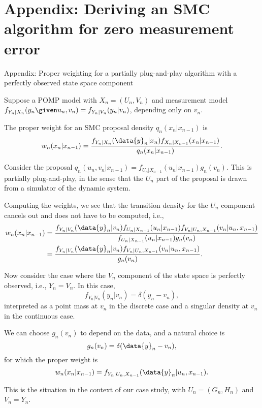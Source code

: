 \section{Appendix: Deriving an SMC algorithm for zero measurement error}

\begin{frame}[fragile]{Appendix: Proper weighting for a partially plug-and-play algorithm with a perfectly observed state space component}

\vspace{-2mm}

\bi

\item Suppose a POMP model with $X_n=(U_n,V_n)$ and measurement model $f_{Y_n|X_n}(y_n\given u_n,v_n) = f_{Y_n|V_n}(y_n|v_n)$, depending only on $v_n$. 

\item The proper weight for an SMC proposal density $q_n(x_n|x_{n-1})$ is
$$ 
w_{n}(x_n|x_{n-1}) = \frac{f_{Y_n|X_n}(\data{y}_n|x_n)f_{X_n|X_{n-1}}(x_n|x_{n-1})}{q_n(x_n|x_{n-1})}.
$$

\item Consider the  proposal
$q_n(u_n,v_n|x_{n-1}) = f_{U_n|X_{n-1}}(u_n|x_{n-1}) g_n(v_n)$.
This is partially plug-and-play, in the sense that the $U_n$ part of the proposal is drawn from a simulator of the dynamic system. 

\item Computing the weights, we see that the transition density for the $U_n$ component cancels out and does not have to be computed, i.e.,
\ei
$$\begin{aligned}
w_{n}(x_n|x_{n-1}) &= \frac{f_{Y_n|V_n}(\data{y}_n|v_n)f_{U_n|X_{n-1}}(u_n|x_{n-1})f_{V_n|U_n,X_{n-1}}(v_n|u_n,x_{n-1})}{f_{U_n|X_{n-1}}(u_n|x_{n-1}) g_n(v_n)} \\
&= \frac{f_{Y_n|V_n}(\data{y}_n|v_n)f_{V_n|U_n,X_{n-1}}(v_n|u_n,x_{n-1})}{ g_n(v_n)}.
\end{aligned}
$$

\end{frame}

\begin{frame}[fragile]

\bi

\item Now consider the case where the $V_n$ component of the state space is perfectly observed, i.e., $Y_n=V_n$. In this case, 
$$ 
f_{Y_n|V_n}(y_n|v_n) = \delta(y_n-v_n),
$$
interpreted as a point mass at $v_n$ in the discrete case and a singular density at $v_n$ in the continuous case. 

\item We can choose $g_n(v_n)$ to depend on the data, and a natural choice is 
$$
g_n(v_n)=\delta(\data{y}_n-v_n),
$$
for which the proper weight is
$$
w_{n}(x_n|x_{n-1}) = f_{Y_n|U_n,X_{n-1}}(\data{y}_n|u_n,x_{n-1}).
$$

\item This is the situation in the context of our case study, with $U_n=(G_n,H_n)$ and $V_n=Y_n$.


\ei

\end{frame}

